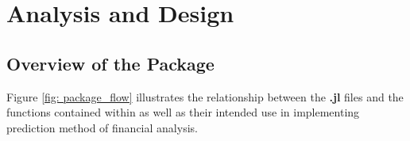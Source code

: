 \chapter{Analysis and Design}
\label{chapter: Analysis}

\section{Overview of the Package}

Figure \ref{fig: package_flow} illustrates the relationship between the \textbf{.jl} files and the functions contained within as well as their intended use in implementing prediction method of financial analysis.

